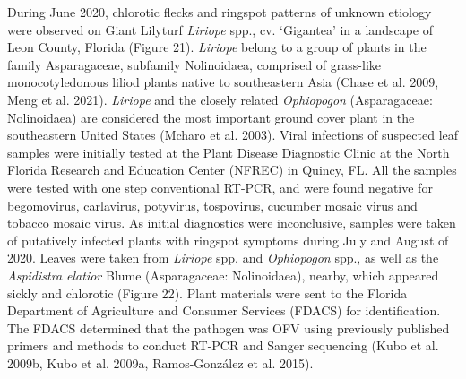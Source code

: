 \documentclass[12pt,final,CPage]{ufthesis}
\begin{document}
{  During June 2020, chlorotic flecks and ringspot patterns of unknown etiology were observed on Giant Lilyturf \emph{Liriope} spp., cv. `Gigantea' in a landscape of Leon County, Florida (Figure 21). \emph{Liriope} belong to a group of plants in the family Asparagaceae, subfamily Nolinoidaea, comprised of grass-like monocotyledonous liliod plants native to southeastern Asia (Chase et al. 2009, Meng et al. 2021). \emph{Liriope} and the closely related \emph{Ophiopogon} (Asparagaceae: Nolinoidaea) are considered the most important ground cover plant in the southeastern United States (Mcharo et al. 2003). Viral infections of suspected leaf samples were initially tested at the Plant Disease Diagnostic Clinic at the North Florida Research and Education Center (NFREC) in Quincy, FL. All the samples were tested with one step conventional RT-PCR, and were found negative for begomovirus, carlavirus, potyvirus, tospovirus, cucumber mosaic virus and tobacco mosaic virus. As initial diagnostics were inconclusive, samples were taken of putatively infected plants with ringspot symptoms during July and August of 2020. Leaves were taken from \emph{Liriope} spp. and \emph{Ophiopogon} spp., as well as the \emph{Aspidistra elatior} Blume (Asparagaceae: Nolinoidaea), nearby, which appeared sickly and chlorotic (Figure 22). Plant materials were sent to the Florida Department of Agriculture and Consumer Services (FDACS) for identification. The FDACS determined that the pathogen was OFV using previously published primers and methods to conduct RT-PCR and Sanger sequencing (Kubo et al. 2009b, Kubo et al. 2009a, Ramos-González et al. 2015).
}
\end{document}
